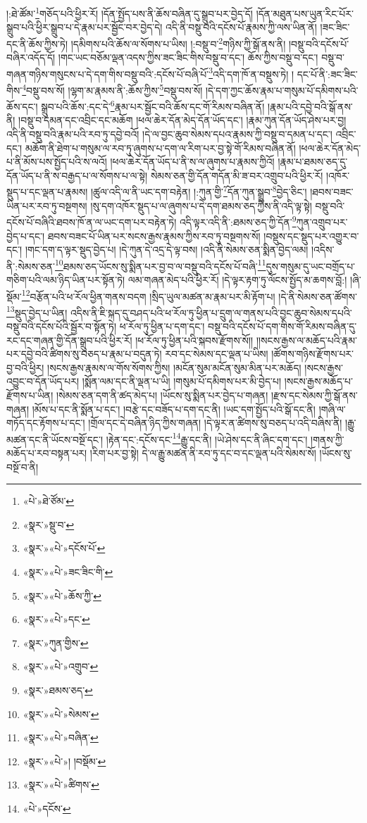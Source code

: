 །:ཐེ་ཚོམ་\footnote{«པེ་»ཐེ་ཙོམ་}གཅོད་པའི་ཕྱིར་རོ། །དོན་སྤྱོད་པས་ནི་ཆོས་བཞིན་དུ་སྒྲུབ་པར་བྱེད་དོ། །དོན་མཐུན་པས་ཡུན་རིང་པོར་སྒྲུབ་པའི་ཕྱིར་སྒྲུབ་པ་དེ་རྣམ་པར་སྦྱོང་བར་བྱེད་དེ། འདི་ནི་བསྡུ་བའི་དངོས་པོ་རྣམས་ཀྱི་ལས་ཡིན་ནོ། །ཟང་ཟིང་དང་ནི་ཆོས་ཀྱིས་ཏེ། །དམིགས་པའི་ཆོས་ལ་སོགས་པ་ཡིས། །:བསྡུ་བ་\footnote{«སྣར་»སྡུ་བ་}གཉིས་ཀྱི་སྒོ་ནས་ནི། །བསྡུ་བའི་དངོས་པོ་བཞིར་འདོད་དོ། །གང་ཡང་བཅོམ་ལྡན་འདས་ཀྱིས་ཟང་ཟིང་གིས་བསྡུ་བ་དང་། ཆོས་ཀྱིས་བསྡུ་བ་དང་། བསྡུ་བ་གཞན་གཉིས་གསུངས་པ་དེ་དག་གིས་བསྡུ་བའི་:དངོས་པོ་བཞི་པོ་\footnote{«སྣར་»«པེ་»དངོས་པོ་}འདི་དག་ཁོ་ན་བསྡུས་ཏེ། །
དང་པོ་ནི་:ཟང་ཟིང་གིས་\footnote{«སྣར་»«པེ་»ཟང་ཟིང་གི་}བསྡུ་བས་སོ། །ལྷག་མ་རྣམས་ནི་:ཆོས་ཀྱིས་\footnote{«སྣར་»«པེ་»ཆོས་ཀྱི་}བསྡུ་བས་སོ། །དེ་དག་ཀྱང་ཆོས་རྣམ་པ་གསུམ་པོ་དམིགས་པའི་ཆོས་དང་། སྒྲུབ་པའི་ཆོས་:དང་དེ་\footnote{«སྣར་»«པེ་»དང་}རྣམ་པར་སྦྱོང་བའི་ཆོས་དང་གོ་རིམས་བཞིན་ནོ། །རྣམ་པའི་དབྱེ་བའི་སྒོ་ནས་ནི། །བསྡུ་བ་དམན་དང་འབྲིང་དང་མཆོག །ཕལ་ཆེར་དོན་མེད་དོན་ཡོད་དང་། །རྣམ་ཀུན་དོན་ཡོད་ཤེས་པར་བྱ། འདི་ནི་བསྡུ་བའི་རྣམ་པའི་རབ་ཏུ་དབྱེ་བའོ། །དེ་ལ་བྱང་ཆུབ་སེམས་དཔའ་རྣམས་ཀྱི་བསྡུ་བ་དམན་པ་དང་། འབྲིང་དང་། མཆོག་ནི་ཐེག་པ་གསུམ་ལ་རབ་ཏུ་ཞུགས་པ་དག་ལ་རིག་པར་བྱ་སྟེ་གོ་རིམས་བཞིན་ནོ། །ཕལ་ཆེར་དོན་མེད་པ་ནི་མོས་པས་སྤྱོད་པའི་ས་ལའོ། །ཕལ་ཆེར་དོན་ཡོད་པ་ནི་ས་ལ་ཞུགས་པ་རྣམས་ཀྱིའོ། །རྣམ་པ་ཐམས་ཅད་དུ་དོན་ཡོད་པ་ནི་ས་བརྒྱད་པ་ལ་སོགས་པ་ལ་སྟེ། སེམས་ཅན་གྱི་དོན་གདོན་མི་ཟ་བར་འགྲུབ་པའི་ཕྱིར་རོ། །འཁོར་སྡུད་པ་དང་ལྡན་པ་རྣམས། །ཚུལ་འདི་ལ་ནི་ཡང་དག་བརྟེན། །:ཀུན་གྱི་\footnote{«སྣར་»ཀུན་གྱིས་}དོན་ཀུན་སྒྲུབ་\footnote{«སྣར་»«པེ་»འགྲུབ་}བྱེད་ཅིང་། །ཐབས་བཟང་ཡིན་པར་རབ་ཏུ་བསྔགས། །སུ་དག་འཁོར་སྡུད་པ་ལ་ཞུགས་པ་དེ་དག་ཐམས་ཅད་ཀྱིས་ནི་འདི་ལྟ་སྟེ། བསྡུ་བའི་དངོས་པོ་བཞིའི་ཐབས་ཁོ་ན་ལ་ཡང་དག་པར་བརྟེན་ཏེ། འདི་ལྟར་འདི་ནི་:ཐམས་ཅད་ཀྱི་དོན་\footnote{«སྣར་»ཐམས་ཅད་}ཀུན་འགྲུབ་པར་བྱེད་པ་དང་། ཐབས་བཟང་པོ་ཡིན་པར་སངས་རྒྱས་རྣམས་ཀྱིས་རབ་ཏུ་བསྔགས་སོ། །བསྡུས་དང་སྡུད་པར་འགྱུར་བ་དང་། །གང་དག་ད་ལྟར་སྡུད་བྱེད་པ། །དེ་ཀུན་དེ་འདྲ་དེ་ལྟ་བས། །འདི་ནི་སེམས་ཅན་སྨིན་བྱེད་ལམ། །འདིས་ནི་:སེམས་ཅན་\footnote{«སྣར་»«པེ་»སེམས་}ཐམས་ཅད་ཡོངས་སུ་སྨིན་པར་བྱ་བ་ལ་བསྡུ་བའི་དངོས་པོ་བཞི་\footnote{«སྣར་»«པེ་»བཞིན་}དུས་གསུམ་དུ་ཡང་བགྲོད་པ་གཅིག་པའི་ལམ་ཉིད་ཡིན་པར་སྟོན་ཏེ། ལམ་གཞན་མེད་པའི་ཕྱིར་རོ། །དེ་ལྟར་རྟག་ཏུ་ལོངས་སྤྱོད་མ་ཆགས་བློ:། །ཞི་སྡོམ་\footnote{«སྣར་»«པེ་»། །བསྡོམ་}བརྩོན་པའི་ཕ་རོལ་ཕྱིན་གནས་བདག །སྲིད་ཡུལ་མཚན་མ་རྣམ་པར་མི་རྟོག་པ། །དེ་ནི་སེམས་ཅན་ཚོགས་\footnote{«སྣར་»«པེ་»ཚིགས་}སྡུད་བྱེད་པ་ཡིན། འདིས་ནི་ཇི་སྐད་དུ་བཤད་པའི་ཕ་རོལ་ཏུ་ཕྱིན་པ་དྲུག་ལ་གནས་པའི་བྱང་ཆུབ་སེམས་དཔའི་བསྡུ་བའི་དངོས་པོའི་སྦྱོར་བ་སྟོན་ཏེ། ཕ་རོལ་ཏུ་ཕྱིན་པ་དག་དང་། བསྡུ་བའི་དངོས་པོ་དག་གིས་གོ་རིམས་བཞིན་དུ་རང་དང་གཞན་གྱི་དོན་སྒྲུབ་པའི་ཕྱིར་རོ། །ཕ་རོལ་ཏུ་ཕྱིན་པའི་སྐབས་རྫོགས་སོ།། །།སངས་རྒྱས་ལ་མཆོད་པའི་རྣམ་པར་དབྱེ་བའི་ཚིགས་སུ་བཅད་པ་རྣམ་པ་བདུན་ཏེ། རབ་དང་སེམས་དང་ལྡན་པ་ཡིས། །ཚོགས་གཉིས་རྫོགས་པར་བྱ་བའི་ཕྱིར། །སངས་རྒྱས་རྣམས་ལ་གོས་སོགས་ཀྱིས། །མངོན་སུམ་མངོན་སུམ་མིན་པར་མཆོད། །སངས་རྒྱས་འབྱུང་བ་དོན་ཡོད་པར། །སྨོན་ལམ་དང་ནི་ལྡན་པ་ཡི། །གསུམ་པོ་དམིགས་པར་མི་བྱེད་པ། །སངས་རྒྱས་མཆོད་པ་རྫོགས་པ་ཡིན། །སེམས་ཅན་དག་ནི་ཚད་མེད་པ། །ཡོངས་སུ་སྨིན་པར་བྱེད་པ་གཞན། །རྫས་དང་སེམས་ཀྱི་སྒོ་ནས་གཞན། །མོས་པ་དང་ནི་སྨོན་པ་དང་། །བརྩེ་དང་བཟོད་པ་དག་དང་ནི། །ཡང་དག་སྤྱོད་པའི་སྒོ་དང་ནི། །གཞི་ལ་གཏོད་དང་རྟོགས་པ་དང་། །གྲོལ་དང་དེ་བཞིན་ཉིད་ཀྱིས་གཞན། །དེ་ལྟར་ན་ཚིགས་སུ་བཅད་པ་འདི་བཞིས་ནི། །རྒྱུ་མཚན་དང་ནི་ཡོངས་བསྔོ་དང་། །རྟེན་དང་:དངོས་དང་\footnote{«པེ་»དངོས་}རྒྱུ་དང་ནི། །ཡེ་ཤེས་དང་ནི་ཞིང་དག་དང་། །གནས་ཀྱི་མཆོད་པ་རབ་བསྟན་པར། །རིག་པར་བྱ་སྟེ། དེ་ལ་རྒྱུ་མཚན་ནི་རབ་ཏུ་དང་བ་དང་ལྡན་པའི་སེམས་སོ། །ཡོངས་སུ་བསྔོ་བ་ནི། 